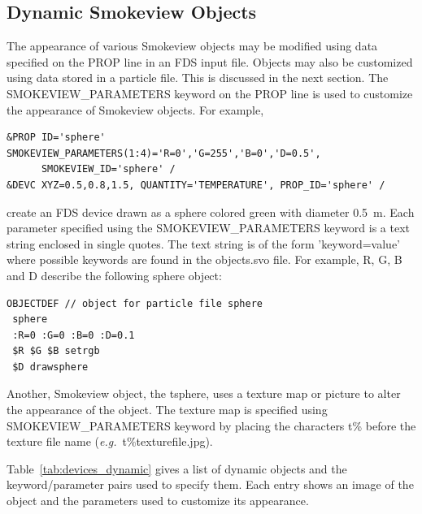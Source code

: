 \subsection{Dynamic Smokeview Objects}
\label{info:SMOKEVIEW_PARAMETERS}

The appearance of various Smokeview objects may be modified using data specified on the {\ct PROP} line in an FDS input file. Objects may also be customized using data stored in a particle file.  This is discussed in the next section. The {\ct SMOKEVIEW\_PARAMETERS} keyword on the {\ct PROP} line is used to customize the appearance of Smokeview objects.  For example,
\begin{lstlisting}
&PROP ID='sphere' SMOKEVIEW_PARAMETERS(1:4)='R=0','G=255','B=0','D=0.5',
      SMOKEVIEW_ID='sphere' /
&DEVC XYZ=0.5,0.8,1.5, QUANTITY='TEMPERATURE', PROP_ID='sphere' /
\end{lstlisting}
create an FDS device drawn as a sphere colored green with diameter 0.5~m. Each parameter specified using the {\ct SMOKEVIEW\_PARAMETERS} keyword is a text string enclosed in single quotes.  The text string is of the form {\ct 'keyword=value'} where possible keywords are found in the {\ct objects.svo} file.  For example, {\ct R}, {\ct G}, {\ct B} and {\ct D} describe the following {\ct sphere} object:
\begin{lstlisting}
OBJECTDEF // object for particle file sphere 
 sphere
 :R=0 :G=0 :B=0 :D=0.1
 $R $G $B setrgb
 $D drawsphere
\end{lstlisting}
Another, Smokeview object, the {\ct tsphere}, uses a texture map or picture to alter the appearance of the object.
The texture map is specified using {\ct SMOKEVIEW\_PARAMETERS} keyword by placing the characters {\ct t\%}
before the texture file name ({\em e.g.}\ {\ct t\%texturefile.jpg}).

Table~\ref{tab:devices_dynamic} gives a list of dynamic objects and the keyword/parameter pairs used to specify them.
Each entry shows an image of the object and the parameters used to customize its appearance.

